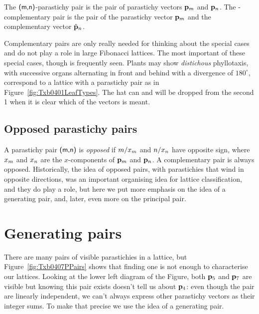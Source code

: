 \begin{definition}\label{def:gp}
The $\textsf{(m,n)}$-parastichy pair is the pair of parastichy vectors ${\mathbf p}_{m}$ and ${\mathbf p}_{n}$.
The -complementary pair is the pair of the parastichy vector ${\mathbf p}_{m}$ and the complementary vector $\hat{\mathbf p}_{n}$.
\label{def:pp}
\end{definition}
Complementary pairs are only really needed for thinking about the special cases  and do not play a role in large Fibonacci lattices. The most important of these special cases, though is frequently seen. Plants may show \textit{distichous} phyllotaxis, with successive organs  alternating in front and behind with a divergence of $180^\circ$, correspond to a lattice with a  parastichy pair as in Figure~\ref{fig:Txb0401LeafTypes}. The  hat can and will be dropped from the second \textsf{1} when it is clear which of the vectors is meant. 

\subsection{Opposed parastichy pairs}
A parastichy pair $\textsf{(m,n)}$ is \emph{opposed} if $m/x_m$ and $n/x_n$ have opposite sign, where $x_m$ and $x_n$ are the $x$-components of ${\mathbf p}_{m}$ and ${\mathbf p}_{n}$. A complementary pair  is always opposed. 
 Historically, the idea of opposed pairs, with parastichies that wind in opposite directions, was an important organising idea for lattice classification, and they do play a role, but here we put more emphasis on the idea of a {generating pair}, and, later,  even more on the principal pair. 




\section{Generating pairs}
There are many pairs of visible parastichies in a lattice, but Figure~\ref{fig:Txb0407PPairs}  shows that finding one is not enough to characterise our lattices.   Looking at the lower left diagram of the Figure, both ${\mathbf p}_{5}$ and ${\mathbf p}_{7}$ are visible but knowing this pair exists doesn't tell us about ${\mathbf p}_{4}$: even though the pair  are linearly independent, we can't always express other parastichy vectors as their integer sums.  To make that precise we use the idea of a generating pair. 

